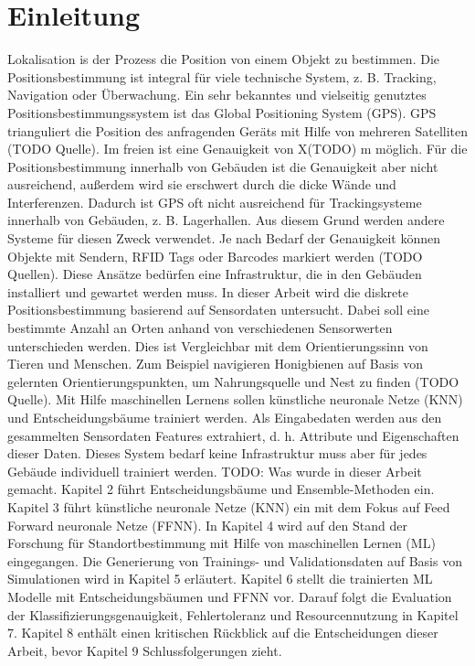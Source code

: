 \chapter{Einleitung}
Lokalisation is der Prozess die Position von einem Objekt zu bestimmen. Die Positionsbestimmung ist integral für viele technische System, z. B. Tracking, Navigation oder Überwachung.
Ein sehr bekanntes und vielseitig genutztes Positionsbestimmungssystem ist das Global Positioning System (GPS). GPS trianguliert die Position des anfragenden Geräts mit Hilfe von mehreren
Satelliten (TODO Quelle). Im freien ist eine Genauigkeit von X(TODO) m möglich. Für die Positionsbestimmung innerhalb von Gebäuden ist die Genauigkeit aber nicht ausreichend,
außerdem wird sie erschwert durch die dicke Wände und Interferenzen. Dadurch ist GPS oft nicht ausreichend für Trackingsysteme innerhalb von Gebäuden, z. B. Lagerhallen. Aus diesem Grund
werden andere Systeme für diesen Zweck verwendet. Je nach Bedarf der Genauigkeit können Objekte mit Sendern, RFID Tags oder Barcodes markiert werden (TODO Quellen). Diese Ansätze bedürfen
eine Infrastruktur, die in den Gebäuden installiert und gewartet werden muss.
\newline
\newline
In dieser Arbeit wird die diskrete Positionsbestimmung basierend auf Sensordaten untersucht. Dabei soll eine bestimmte Anzahl an Orten anhand von verschiedenen Sensorwerten unterschieden werden.
Dies ist Vergleichbar mit dem Orientierungssinn von Tieren und Menschen. Zum Beispiel navigieren Honigbienen auf Basis von gelernten Orientierungspunkten, um Nahrungsquelle und Nest zu finden (TODO Quelle).
Mit Hilfe maschinellen Lernens sollen künstliche neuronale Netze (KNN) und Entscheidungsbäume trainiert werden. Als Eingabedaten werden aus den gesammelten Sensordaten Features extrahiert,
d. h. Attribute und Eigenschaften dieser Daten. Dieses System bedarf keine Infrastruktur muss aber für jedes Gebäude individuell trainiert werden.
\newline
\newline
TODO: Was wurde in dieser Arbeit gemacht.
\newline
\newline
Kapitel 2 führt Entscheidungsbäume und Ensemble-Methoden ein. Kapitel 3 führt künstliche neuronale Netze (KNN) ein mit dem Fokus auf Feed Forward neuronale Netze (FFNN).
In Kapitel 4 wird auf den Stand der Forschung für Standortbestimmung mit Hilfe von maschinellen Lernen (ML) eingegangen.
Die Generierung von Trainings- und Validationsdaten auf Basis von Simulationen wird in Kapitel 5 erläutert.
Kapitel 6 stellt die trainierten ML Modelle mit Entscheidungsbäumen und FFNN vor.
Darauf folgt die Evaluation der Klassifizierungsgenauigkeit, Fehlertoleranz und Resourcennutzung in Kapitel 7.
Kapitel 8 enthält einen kritischen Rückblick auf die Entscheidungen dieser Arbeit, bevor Kapitel 9 Schlussfolgerungen zieht.

